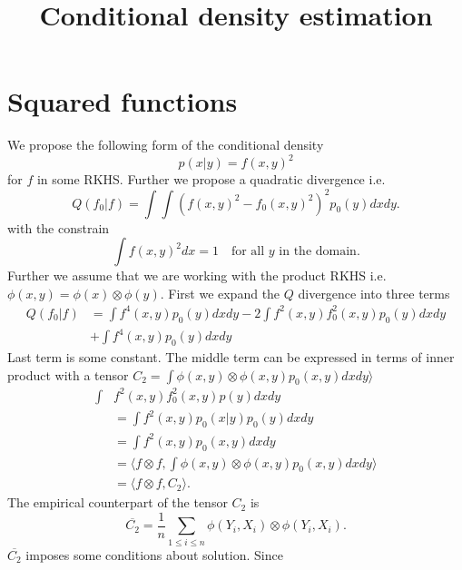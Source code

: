 \documentclass[10pt]{article}
\title{Conditional density estimation}
\begin{document}
\maketitle

\begin{abstract}
\end{abstract}



\section{Squared functions}
We propose the following form of the conditional density 
\begin{equation}
 p(x|y) = f(x,y)^2
\end{equation}
for $f$ in some RKHS. Further we propose a quadratic  divergence i.e.
\begin{equation}
 Q(f_0|f) = \int \int (f(x,y)^2 - f_0(x,y)^2)^2 p_0(y) dx dy. 
\end{equation}
with the constrain  
\begin{equation}
\int f(x,y)^2 dx =1 \quad \text{for all $y$ in the domain}.  
\end{equation}
Further we assume that we  are working with the product RKHS i.e. $\phi(x,y) = \phi(x) \otimes \phi(y)$. First we expand the $Q$ divergence into three terms
\begin{align}
 Q(f_0|f) &= \int f^4(x,y) p_0(y) dx dy - 2 \int f^2(x,y) f_0^2(x,y) p_0(y) dx dy  \\
 &+ \int f^4(x,y) p_0(y) dx dy 
\end{align}
Last term is some constant. The middle term can be expressed in terms of inner product with a tensor $C_2 = \int \phi(x,y) \otimes \phi(x,y) p_0(x,y) dx dy \rangle$ 
\begin{align}
\int &f^2(x,y) f_0^2(x,y) p(y) dx dy \\ 
&=\int f^2(x,y) p_0(x|y) p_0(y) dx dy    \\ 
&= \int f^2(x,y) p_0(x,y) dx dy  \\
&=\langle f \otimes f  , \int \phi(x,y) \otimes \phi(x,y) p_0(x,y) dx dy \rangle \\
&= \langle f \otimes f  , C_2 \rangle.
\end{align}
The empirical counterpart of the tensor $C_2$ is
\begin{equation}
 \overline{ C_2} = \frac 1 n \sum_{1 \leq i \leq n } \phi(Y_{i},X_{i}) \otimes \phi(Y_{i},X_{i}). 
\end{equation}
$\overline{ C_2}$ imposes some conditions about solution. Since 
\end{document}
